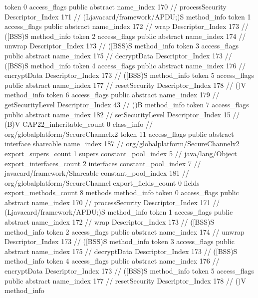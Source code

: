 {{{{{					token	0
					access_flags	public abstract
					name_index	170		// processSecurity
					Descriptor_Index	171		// (Ljavacard/framework/APDU;)S
				}
				method_info {
					token	1
					access_flags	public abstract
					name_index	172		// wrap
					Descriptor_Index	173		// ([BSS)S
				}
				method_info {
					token	2
					access_flags	public abstract
					name_index	174		// unwrap
					Descriptor_Index	173		// ([BSS)S
				}
				method_info {
					token	3
					access_flags	public abstract
					name_index	175		// decryptData
					Descriptor_Index	173		// ([BSS)S
				}
				method_info {
					token	4
					access_flags	public abstract
					name_index	176		// encryptData
					Descriptor_Index	173		// ([BSS)S
				}
				method_info {
					token	5
					access_flags	public abstract
					name_index	177		// resetSecurity
					Descriptor_Index	178		// ()V
				}
				method_info {
					token	6
					access_flags	public abstract
					name_index	179		// getSecurityLevel
					Descriptor_Index	43		// ()B
				}
				method_info {
					token	7
					access_flags	public abstract
					name_index	182		// setSecurityLevel
					Descriptor_Index	15		// (B)V
				}
			}
			CAP22_inheritable_count	0
		}
		class_info {		// org/globalplatform/SecureChannelx2
			token	11
			access_flags	public abstract interface shareable
			name_index	187		// org/globalplatform/SecureChannelx2
			export_supers_count	1
			supers {
				constant_pool_index	5		// java/lang/Object
			}
			export_interfaces_count	2
			interfaces {
				constant_pool_index	7		// javacard/framework/Shareable
				constant_pool_index	181		// org/globalplatform/SecureChannel
			}
			export_fields_count	0
			fields {
			}
			export_methods_count	8
			methods {
				method_info {
					token	0
					access_flags	public abstract
					name_index	170		// processSecurity
					Descriptor_Index	171		// (Ljavacard/framework/APDU;)S
				}
				method_info {
					token	1
					access_flags	public abstract
					name_index	172		// wrap
					Descriptor_Index	173		// ([BSS)S
				}
				method_info {
					token	2
					access_flags	public abstract
					name_index	174		// unwrap
					Descriptor_Index	173		// ([BSS)S
				}
				method_info {
					token	3
					access_flags	public abstract
					name_index	175		// decryptData
					Descriptor_Index	173		// ([BSS)S
				}
				method_info {
					token	4
					access_flags	public abstract
					name_index	176		// encryptData
					Descriptor_Index	173		// ([BSS)S
				}
				method_info {
					token	5
					access_flags	public abstract
					name_index	177		// resetSecurity
					Descriptor_Index	178		// ()V
				}
				method_info {
}}}}}

